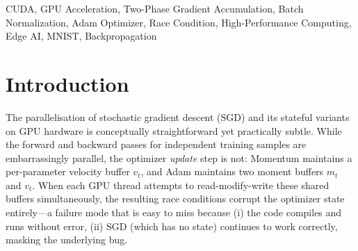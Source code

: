 \documentclass[conference]{IEEEtran}
\begin{document}
\begin{abstract}
We present \textit{CUDAnet}, a from-scratch CUDA implementation of a multi-layer perceptron (MLP) that addresses a fundamental correctness problem in GPU-parallel stateful optimizers. When momentum-based and adaptive optimizers (Momentum, Adam) are parallelized naively—one thread per sample—concurrent writes to shared optimizer state create race conditions that reduce accuracy to near-random chance ($\leq\!18\%$). We identify the root cause as cross-thread state collision in the velocity and moment buffers and resolve it through a \textbf{two-phase gradient accumulation} strategy: Phase~1 performs all forward and backward passes in parallel, accumulating gradients atomically; Phase~2 applies optimizer updates in a single, race-free kernel after a global barrier. On MNIST with an NVIDIA RTX A2000 (sm\_86), CUDAnet achieves: SGD 94.3\%, BN+SGD 93.1\%, Adam \textbf{97.2\%}, Adam+LR (cosine) 97.0\%, and Momentum \textbf{97.2\%}—representing recoveries of $+97.2$ percentage points for Momentum and $+63.1$ pp for BN+Adam+LR over the race-condition baselines of 0\% and 17.9\% respectively. Training throughput reaches over \textbf{2{,}000$\times$} the serial CPU baseline ($\sim\!0.95$\,s/epoch for Adam vs.\ an estimated $\sim\!2{,}070$\,s for serial CPU, 23 mini-batches at 90\,s each). The full engine is \textless 2\,MB with zero external dependencies, making it viable for Edge/IoT deployment where frameworks like PyTorch ($>2$\,GB) are impractical.
\end{abstract}

\begin{IEEEkeywords}
CUDA, GPU Acceleration, Two-Phase Gradient Accumulation, Batch Normalization, Adam Optimizer, Race Condition, High-Performance Computing, Edge AI, MNIST, Backpropagation
\end{IEEEkeywords}


\section{Introduction}

The parallelisation of stochastic gradient descent (SGD) and its stateful variants on GPU hardware is conceptually straightforward yet practically subtle. While the forward and backward passes for independent training samples are embarrassingly parallel, the optimizer \emph{update} step is not: Momentum maintains a per-parameter velocity buffer $v_t$, and Adam maintains two moment buffers $m_t$ and $v_t$. When each GPU thread attempts to read-modify-write these shared buffers simultaneously, the resulting race conditions corrupt the optimizer state entirely—a failure mode that is easy to miss because (i) the code compiles and runs without error, (ii) SGD (which has no state) continues to work correctly, masking the underlying bug.
\end{document}

